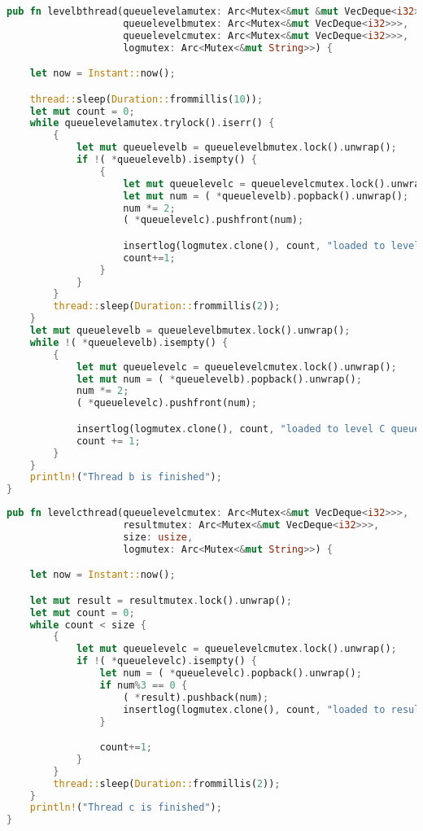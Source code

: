 \begin{lstlisting}[language=Rust, caption={ Реализация урованя B конвейера},
                    label={list:levelb}]
pub fn levelbthread(queuelevelamutex: Arc<Mutex<&mut &mut VecDeque<i32>>>, 
                    queuelevelbmutex: Arc<Mutex<&mut VecDeque<i32>>>,
                    queuelevelcmutex: Arc<Mutex<&mut VecDeque<i32>>>,
                    logmutex: Arc<Mutex<&mut String>>) {

    let now = Instant::now();

    thread::sleep(Duration::frommillis(10));
    let mut count = 0;
    while queuelevelamutex.trylock().iserr() {
        {
            let mut queuelevelb = queuelevelbmutex.lock().unwrap();
            if !( *queuelevelb).isempty() {
                {
                    let mut queuelevelc = queuelevelcmutex.lock().unwrap();
                    let mut num = ( *queuelevelb).popback().unwrap();
                    num *= 2;
                    ( *queuelevelc).pushfront(num);

                    insertlog(logmutex.clone(), count, "loaded to level C queue", now.elapsed());
                    count+=1;
                }
            }
        }
        thread::sleep(Duration::frommillis(2));
    }
    let mut queuelevelb = queuelevelbmutex.lock().unwrap();
    while !( *queuelevelb).isempty() {
        {
            let mut queuelevelc = queuelevelcmutex.lock().unwrap();
            let mut num = ( *queuelevelb).popback().unwrap();
            num *= 2;
            ( *queuelevelc).pushfront(num);

            insertlog(logmutex.clone(), count, "loaded to level C queue", now.elapsed());
            count += 1;
        }
    }
    println!("Thread b is finished");
}
\end{lstlisting}

\begin{lstlisting}[language=Rust, caption={ Реализация уровня C конвейера},
                    label={list:levelc}]
pub fn levelcthread(queuelevelcmutex: Arc<Mutex<&mut VecDeque<i32>>>, 
                    resultmutex: Arc<Mutex<&mut VecDeque<i32>>>,
                    size: usize,
                    logmutex: Arc<Mutex<&mut String>>) {

    let now = Instant::now();

    let mut result = resultmutex.lock().unwrap();
    let mut count = 0;
    while count < size {
        {
            let mut queuelevelc = queuelevelcmutex.lock().unwrap();
            if !( *queuelevelc).isempty() {
                let num = ( *queuelevelc).popback().unwrap();
                if num%3 == 0 {
                    ( *result).pushback(num);
                    insertlog(logmutex.clone(), count, "loaded to result", now.elapsed());
                }

                count+=1;
            }
        }
        thread::sleep(Duration::frommillis(2));
    }
    println!("Thread c is finished");
}

\end{lstlisting}
